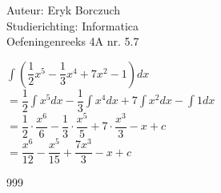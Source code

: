 \documentclass[a4paper]{article}
\begin{document}
  
\noindent \large Auteur: Eryk Borczuch \\
\noindent \large Studierichting: Informatica\\
\noindent \large Oefeningenreeks 4A nr. 5.7\\

\medskip

\normalsize

$\displaystyle\int \left(\dfrac{1}{2}x^5 - \dfrac{1}{3} x^4 +7x^2 -1\right)dx$\\

$= \dfrac{1}{2}\displaystyle\int x^5dx -\dfrac{1}{3}\displaystyle\int x^4dx+7\displaystyle\int x^2dx-\displaystyle\int 1dx $\\

$= \dfrac{1}{2}\cdot \dfrac{x^6}{6} - \dfrac{1}{3} \cdot \dfrac{x^5}{5} + 7 \cdot \dfrac{x^3}{3} -x +c$\\

$= \dfrac{x^6}{12} -\dfrac{x^5}{15} + \dfrac{7x^3}{3} -x +c$\\


\begin{thebibliography}{999}
\end{thebibliography}
\end{document}
